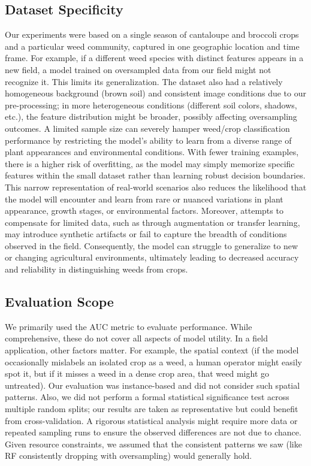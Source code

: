 \documentclass[letterpaper, notitlepage]{report}
\begin{document}
\subsection{Dataset Specificity}
Our experiments were based on a single season of cantaloupe and broccoli crops and a particular weed community, captured in one geographic location and time frame.  For example, if a different weed species with distinct features appears in a new field, a model trained on oversampled data from our field might not recognize it. This limits its generalization. The dataset also had a relatively homogeneous background (brown soil) and consistent image conditions due to our pre-processing; in more heterogeneous conditions (different soil colors, shadows, etc.), the feature distribution might be broader, possibly affecting oversampling outcomes.
A limited sample size can severely hamper weed/crop classification performance by restricting the model’s ability to learn from a diverse range of plant appearances and environmental conditions. With fewer training examples, there is a higher risk of overfitting, as the model may simply memorize specific features within the small dataset rather than learning robust decision boundaries. This narrow representation of real-world scenarios also reduces the likelihood that the model will encounter and learn from rare or nuanced variations in plant appearance, growth stages, or environmental factors. Moreover, attempts to compensate for limited data, such as through augmentation or transfer learning, may introduce synthetic artifacts or fail to capture the breadth of conditions observed in the field. Consequently, the model can struggle to generalize to new or changing agricultural environments, ultimately leading to decreased accuracy and reliability in distinguishing weeds from crops.

\subsection{Evaluation Scope}
We primarily used the AUC metric to evaluate performance. While comprehensive, these do not cover all aspects of model utility. In a field application, other factors matter. For example, the spatial context (if the model occasionally mislabels an isolated crop as a weed, a human operator might easily spot it, but if it misses a weed in a dense crop area, that weed might go untreated). Our evaluation was instance-based and did not consider such spatial patterns. Also, we did not perform a formal statistical significance test across multiple random splits; our results are taken as representative but could benefit from cross-validation. A rigorous statistical analysis might require more data or repeated sampling runs to ensure the observed differences are not due to chance. Given resource constraints, we assumed that the consistent patterns we saw (like RF consistently dropping with oversampling) would generally hold.
\end{document}
